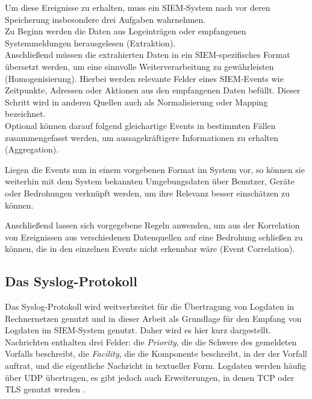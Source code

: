 Um diese Ereignisse zu erhalten, muss ein SIEM-System nach \cite{detken2014} vor deren Speicherung insbesondere drei Aufgaben wahrnehmen.\\
Zu Beginn werden die Daten aus Logeinträgen oder empfangenen Systemmeldungen herausgelesen (Extraktion).\\
Anschließend müssen die extrahierten Daten in ein SIEM-spezifisches Format übersetzt werden, um eine sinnvolle Weiterverarbeitung zu gewährleisten (Homogenisierung). Hierbei werden relevante Felder eines SIEM-Events wie Zeitpunkte, Adressen oder Aktionen aus den empfangenen Daten befüllt. Dieser Schritt wird in anderen Quellen auch als Normalisierung oder Mapping bezeichnet.\\
Optional können darauf folgend gleichartige Events in bestimmten Fällen zusammengefasst werden, um aussagekräftigere Informationen zu erhalten (Aggregation).

Liegen die Events nun in einem vorgebenen Format im System vor, so können sie weiterhin mit dem System bekannten Umgebungsdaten über Benutzer, Geräte oder Bedrohungen verknüpft werden, um ihre Relevanz besser einschätzen zu können. 

Anschließend lassen sich vorgegebene Regeln anwenden, um aus der Korrelation von Ereignissen aus verschiedenen Datenquellen auf eine Bedrohung schließen zu können, die in den einzelnen Events nicht erkennbar wäre (Event Correlation).

\subsection*{Das Syslog-Protokoll}

\label{sec_basics_siem_syslog}

Das Syslog-Protokoll wird weitverbreitet für die Übertragung von Logdaten in Rechnernetzen genutzt und in dieser Arbeit als Grundlage für den Empfang von Logdaten im SIEM-System genutzt. Daher wird es hier kurz dargestellt. Nachrichten enthalten drei Felder: die \textit{Priority}, die die Schwere des gemeldeten Vorfalls beschreibt, die \textit{Facility}, die die Komponente beschreibt, in der der Vorfall auftrat, und die eigentliche Nachricht in textueller Form. Logdaten werden häufig über UDP übertragen, es gibt jedoch auch Erweiterungen, in denen TCP oder TLS genutzt wreden \cite{rfc5424}.
